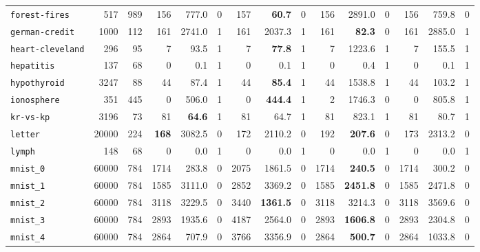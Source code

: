\begin{tabular}{lccrrrrrrrrrrrr}
\texttt{forest-fires} & \multicolumn{1}{r}{517} & \multicolumn{1}{r}{989}  & 156 & 777.0 & 0 & 157 & \textbf{60.7} & 0 & 156 & 2891.0 & 0 & 156 & 759.8 & 0\\
\texttt{german-credit} & \multicolumn{1}{r}{1000} & \multicolumn{1}{r}{112}  & 161 & 2741.0 & 1 & 161 & 2037.3 & 1 & 161 & \textbf{82.3} & 0 & 161 & 2885.0 & 1\\
\texttt{heart-cleveland} & \multicolumn{1}{r}{296} & \multicolumn{1}{r}{95}  & 7 & 93.5 & 1 & 7 & \textbf{77.8} & 1 & 7 & 1223.6 & 1 & 7 & 155.5 & 1\\
\texttt{hepatitis} & \multicolumn{1}{r}{137} & \multicolumn{1}{r}{68}  & 0 & 0.1 & 1 & 0 & 0.1 & 1 & 0 & 0.4 & 1 & 0 & 0.1 & 1\\
\texttt{hypothyroid} & \multicolumn{1}{r}{3247} & \multicolumn{1}{r}{88}  & 44 & 87.4 & 1 & 44 & \textbf{85.4} & 1 & 44 & 1538.8 & 1 & 44 & 103.2 & 1\\
\texttt{ionosphere} & \multicolumn{1}{r}{351} & \multicolumn{1}{r}{445}  & 0 & 506.0 & 1 & 0 & \textbf{444.4} & 1 & 2 & 1746.3 & 0 & 0 & 805.8 & 1\\
\texttt{kr-vs-kp} & \multicolumn{1}{r}{3196} & \multicolumn{1}{r}{73}  & 81 & \textbf{64.6} & 1 & 81 & 64.7 & 1 & 81 & 823.1 & 1 & 81 & 80.7 & 1\\
\texttt{letter} & \multicolumn{1}{r}{20000} & \multicolumn{1}{r}{224}  & \textbf{168} & 3082.5 & 0 & 172 & 2110.2 & 0 & 192 & \textbf{207.6} & 0 & 173 & 2313.2 & 0\\
\texttt{lymph} & \multicolumn{1}{r}{148} & \multicolumn{1}{r}{68}  & 0 & 0.0 & 1 & 0 & 0.0 & 1 & 0 & 0.0 & 1 & 0 & 0.0 & 1\\
\texttt{mnist\_0} & \multicolumn{1}{r}{60000} & \multicolumn{1}{r}{784}  & 1714 & 283.8 & 0 & 2075 & 1861.5 & 0 & 1714 & \textbf{240.5} & 0 & 1714 & 300.2 & 0\\
\texttt{mnist\_1} & \multicolumn{1}{r}{60000} & \multicolumn{1}{r}{784}  & 1585 & 3111.0 & 0 & 2852 & 3369.2 & 0 & 1585 & \textbf{2451.8} & 0 & 1585 & 2471.8 & 0\\
\texttt{mnist\_2} & \multicolumn{1}{r}{60000} & \multicolumn{1}{r}{784}  & 3118 & 3229.5 & 0 & 3440 & \textbf{1361.5} & 0 & 3118 & 3214.3 & 0 & 3118 & 3569.6 & 0\\
\texttt{mnist\_3} & \multicolumn{1}{r}{60000} & \multicolumn{1}{r}{784}  & 2893 & 1935.6 & 0 & 4187 & 2564.0 & 0 & 2893 & \textbf{1606.8} & 0 & 2893 & 2304.8 & 0\\
\texttt{mnist\_4} & \multicolumn{1}{r}{60000} & \multicolumn{1}{r}{784}  & 2864 & 707.9 & 0 & 3766 & 3356.9 & 0 & 2864 & \textbf{500.7} & 0 & 2864 & 1033.8 & 0\\

\end{tabular}
